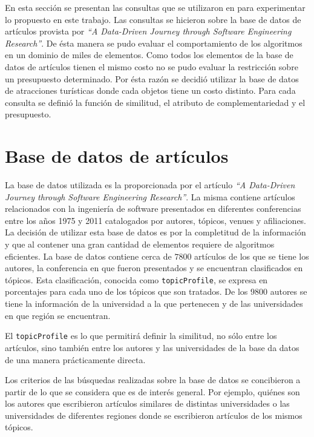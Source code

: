 En esta sección se presentan las consultas que se utilizaron en para experimentar lo propuesto en este trabajo. Las consultas se hicieron sobre la base de datos de artículos provista por \textit{\textquotedblleft A Data-Driven Journey through Software Engineering Research\textquotedblright}\cite{dataDrive}. De ésta manera se pudo evaluar el comportamiento de los algoritmos en un dominio de miles de elementos. Como todos los elementos de la base de datos de artículos tienen el mismo costo no se pudo evaluar la restricción sobre un presupuesto determinado. Por ésta razón se decidió utilizar la base de datos de atracciones turísticas donde cada objetos tiene un costo distinto. Para cada consulta se definió la función de similitud, el atributo de complementariedad y el presupuesto. 
\section{Base de datos de artículos}
La base de datos utilizada es la proporcionada por el artículo \textit{\textquotedblleft A Data-Driven Journey through Software Engineering Research\textquotedblright}\cite{dataDrive}. La misma contiene artículos relacionados con la ingeniería de software presentados en diferentes conferencias entre los años 1975 y 2011 catalogados por autores, tópicos, venues y afiliaciones. La decisión de utilizar esta base de datos es por la completitud de la información y que al contener una gran cantidad de elementos requiere de algoritmos eficientes. La base de datos contiene cerca de $7800$ artículos de los que se tiene los autores, la conferencia en que fueron presentados y se encuentran clasificados en tópicos. Esta clasificación, conocida como \texttt{topicProfile}, se expresa en porcentajes para cada uno de los tópicos que son tratados. De los $9800$ autores se tiene la información de la universidad a la que pertenecen y de las universidades en que región se encuentran.

El \texttt{topicProfile} es lo que permitirá definir la similitud, no sólo entre los artículos, sino también entre los autores y las universidades de la base da datos de una manera prácticamente directa.

Los criterios de las búsquedas realizadas sobre la base de datos se concibieron a partir de lo que se considera que es de interés general. Por ejemplo, quiénes son los autores que escribieron artículos similares de distintas universidades o las universidades de diferentes regiones donde se escribieron artículos de los mismos tópicos.

